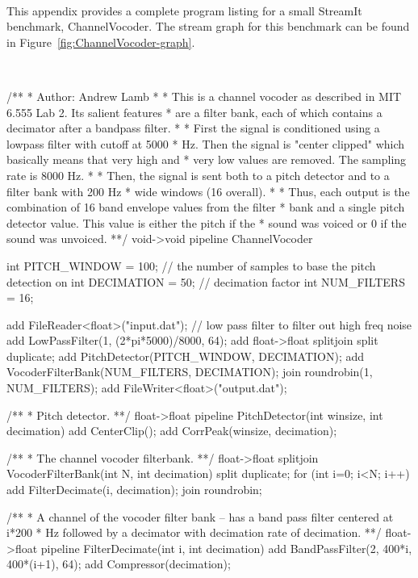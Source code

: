\label{chap:example-program}

~ \\ \vspace{-0.7in}

\noindent This appendix provides a complete program listing for a
small StreamIt benchmark, ChannelVocoder.  The stream graph for this
benchmark can be found in Figure~\ref{fig:ChannelVocoder-graph}.

~ \\ \vspace{-0.8in}

/** 
 * Author:  Andrew Lamb
 *
 * This is a channel vocoder as described in MIT 6.555 Lab 2.  Its salient features
 * are a filter bank, each of which contains a decimator after a bandpass filter.
 * 
 * First the signal is conditioned using a lowpass filter with cutoff at 5000
 * Hz. Then the signal is "center clipped" which basically means that very high and
 * very low values are removed.  The sampling rate is 8000 Hz.
 *
 * Then, the signal is sent both to a pitch detector and to a filter bank with 200 Hz
 * wide windows (16 overall).
 * 
 * Thus, each output is the combination of 16 band envelope values from the filter
 * bank and a single pitch detector value. This value is either the pitch if the
 * sound was voiced or 0 if the sound was unvoiced.
 **/
void->void pipeline ChannelVocoder {
    int PITCH_WINDOW = 100; // the number of samples to base the pitch detection on
    int DECIMATION   = 50;  // decimation factor
    int NUM_FILTERS  = 16; 
    
    add FileReader<float>("input.dat");
    // low pass filter to filter out high freq noise
    add LowPassFilter(1, (2*pi*5000)/8000, 64); 
    add float->float splitjoin {
        split duplicate;
        add PitchDetector(PITCH_WINDOW, DECIMATION);
        add VocoderFilterBank(NUM_FILTERS, DECIMATION);
        join roundrobin(1, NUM_FILTERS);
    }
    add FileWriter<float>("output.dat");
}
/** 
 * Pitch detector.
 **/
float->float pipeline PitchDetector(int winsize, int decimation) {
    add CenterClip();
    add CorrPeak(winsize, decimation);
}

/**
 * The channel vocoder filterbank. 
 **/
float->float splitjoin VocoderFilterBank(int N, int decimation) {
    split duplicate;
    for (int i=0; i<N; i++) {
        add FilterDecimate(i, decimation);
    }
    join roundrobin;
}

/** 
 * A channel of the vocoder filter bank -- has a band pass filter centered at i*200
 * Hz followed by a decimator with decimation rate of decimation.
 **/
float->float pipeline FilterDecimate(int i, int decimation) {
    add BandPassFilter(2, 400*i, 400*(i+1), 64); 
    add Compressor(decimation);
}

